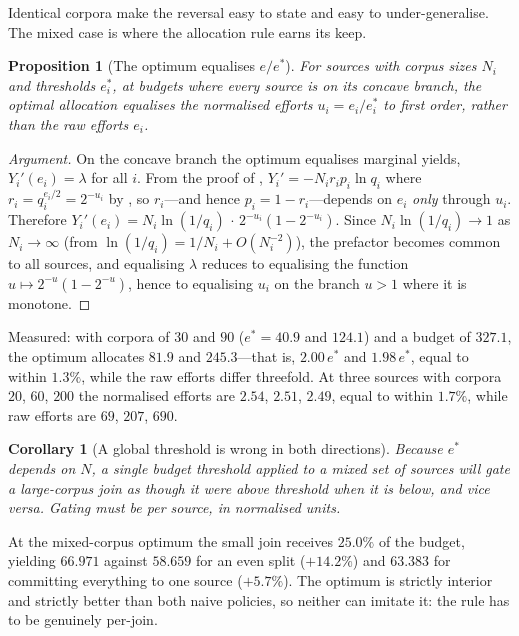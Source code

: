 \documentclass[11pt,twocolumn,a4paper]{article}
\theoremstyle{thmstyle}
\newtheorem{proposition}[theorem]{Proposition}
\newtheorem{corollary}[theorem]{Corollary}
\theoremstyle{definition}
\theoremstyle{remark}
\newcommand{\eff}{e}
\newcommand{\estar}{e^{*}}
\newcommand{\yield}{Y}
\begin{document}
Identical corpora make the reversal easy to state and easy to
under-generalise. The mixed case is where the allocation rule earns its
keep.

\begin{proposition}[The optimum equalises $\eff/\estar$]
\label{prop:normalised}
For sources with corpus sizes $N_i$ and thresholds $\estar_i$, at budgets
where every source is on its concave branch, the optimal allocation
equalises the normalised efforts $u_i=\eff_i/\estar_i$ to first order,
rather than the raw efforts $\eff_i$.
\end{proposition}

\begin{proof}[Argument]
On the concave branch the optimum equalises marginal yields,
$\yield_i'(\eff_i)=\lambda$ for all $i$. From the proof of
, $\yield_i'=-N_i r_i p_i\ln q_i$ where
$r_i=q_i^{\eff_i/2}=2^{-u_i}$ by , so $r_i$---and hence
$p_i=1-r_i$---depends on $\eff_i$ \emph{only} through $u_i$. Therefore
$\yield_i'(\eff_i)=N_i\ln(1/q_i)\,\cdot\,2^{-u_i}(1-2^{-u_i})$. Since
$N_i\ln(1/q_i)\to 1$ as $N_i\to\infty$ (from
$\ln(1/q_i)=1/N_i+O(N_i^{-2})$), the prefactor becomes common to all
sources, and equalising $\lambda$ reduces to equalising the function
$u\mapsto 2^{-u}(1-2^{-u})$, hence to equalising $u_i$ on the branch
$u>1$ where it is monotone.
\end{proof}

Measured: with corpora of $30$ and $90$ ($\estar=40.9$ and $124.1$) and a
budget of $327.1$, the optimum allocates $81.9$ and $245.3$---that is,
$2.00\,\estar$ and $1.98\,\estar$, equal to within $1.3\%$, while the raw
efforts differ threefold. At three sources with corpora $20$, $60$, $200$
the normalised efforts are $2.54$, $2.51$, $2.49$, equal to within
$1.7\%$, while raw efforts are $69$, $207$, $690$.

\begin{corollary}[A global threshold is wrong in both directions]
\label{cor:perjoin}
Because $\estar$ depends on $N$, a single budget threshold applied to a
mixed set of sources will gate a large-corpus join as though it were
above threshold when it is below, and vice versa. Gating must be per
source, in normalised units.
\end{corollary}

At the mixed-corpus optimum the small join receives $25.0\%$ of the
budget, yielding $66.971$ against $58.659$ for an even split ($+14.2\%$)
and $63.383$ for committing everything to one source ($+5.7\%$). The
optimum is strictly interior and strictly better than both naive
policies, so neither can imitate it: the rule has to be genuinely
per-join.
\end{document}
